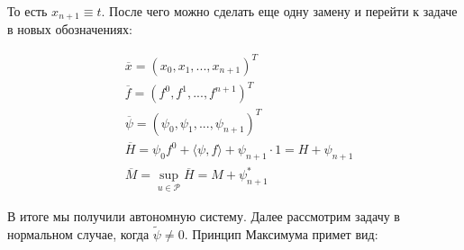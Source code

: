 \documentclass[oneside, final, 14pt, draft]{article}
\theoremstyle{definition}
\theoremstyle{definition}
\theoremstyle{remark}
\theoremstyle{theorem}
\begin{document}
То есть $x_{n+1} \equiv t$. После чего можно сделать еще одну замену и перейти к задаче в новых обозначениях:

\begin{align*}
&\overline{x} = (x_0, x_1, ..., x_{n+1})^T\\
&\overline{f} = (f^0, f^1, ..., f^{n+1})^T\\
&\overline{\psi} = (\psi_0, \psi_1, ..., \psi_{n+1})^T\\
&\overline{H} = \psi_0 f^0 + \langle\psi, f\rangle + \psi_{n+1}\cdot 1 = H + \psi_{n+1}\\
&\overline{M} = \sup\limits_{u \in \mathcal{P}} \overline{H} = M + \psi_{n+1}^*
\end{align*}

{\flushleft В итоге мы получили автономную систему. Далее рассмотрим задачу в нормальном случае, когда $\widetilde{\psi} \neq 0$. Принцип Максимума примет вид:} 
\end{document}
